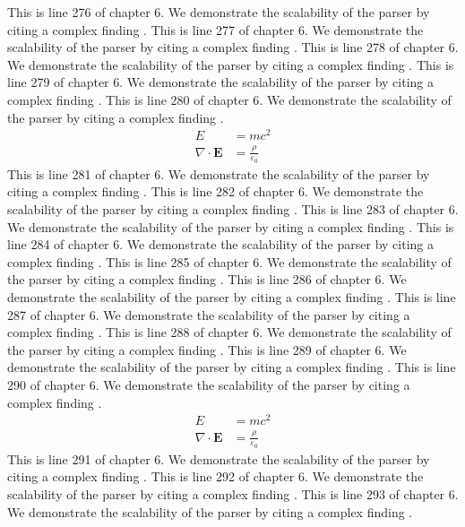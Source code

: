 This is line 276 of chapter 6. We demonstrate the scalability of the parser by citing a complex finding \cite{ref6_276}.
This is line 277 of chapter 6. We demonstrate the scalability of the parser by citing a complex finding \cite{ref6_277}.
This is line 278 of chapter 6. We demonstrate the scalability of the parser by citing a complex finding \cite{ref6_278}.
This is line 279 of chapter 6. We demonstrate the scalability of the parser by citing a complex finding \cite{ref6_279}.
This is line 280 of chapter 6. We demonstrate the scalability of the parser by citing a complex finding \cite{ref6_280}.
\begin{align*}
  E &= mc^2 \\
  \nabla \cdot \mathbf{E} &= \frac{\rho}{\varepsilon_0}
\end{align*}
This is line 281 of chapter 6. We demonstrate the scalability of the parser by citing a complex finding \cite{ref6_281}.
This is line 282 of chapter 6. We demonstrate the scalability of the parser by citing a complex finding \cite{ref6_282}.
This is line 283 of chapter 6. We demonstrate the scalability of the parser by citing a complex finding \cite{ref6_283}.
This is line 284 of chapter 6. We demonstrate the scalability of the parser by citing a complex finding \cite{ref6_284}.
This is line 285 of chapter 6. We demonstrate the scalability of the parser by citing a complex finding \cite{ref6_285}.
This is line 286 of chapter 6. We demonstrate the scalability of the parser by citing a complex finding \cite{ref6_286}.
This is line 287 of chapter 6. We demonstrate the scalability of the parser by citing a complex finding \cite{ref6_287}.
This is line 288 of chapter 6. We demonstrate the scalability of the parser by citing a complex finding \cite{ref6_288}.
This is line 289 of chapter 6. We demonstrate the scalability of the parser by citing a complex finding \cite{ref6_289}.
This is line 290 of chapter 6. We demonstrate the scalability of the parser by citing a complex finding \cite{ref6_290}.
\begin{align*}
  E &= mc^2 \\
  \nabla \cdot \mathbf{E} &= \frac{\rho}{\varepsilon_0}
\end{align*}
This is line 291 of chapter 6. We demonstrate the scalability of the parser by citing a complex finding \cite{ref6_291}.
This is line 292 of chapter 6. We demonstrate the scalability of the parser by citing a complex finding \cite{ref6_292}.
This is line 293 of chapter 6. We demonstrate the scalability of the parser by citing a complex finding \cite{ref6_293}.
